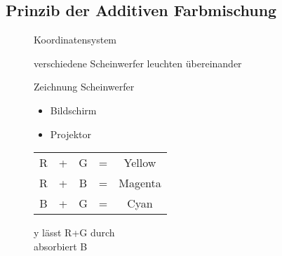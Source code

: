 \documentclass[11pt]{article}
\begin{document}
\subsection{Prinzib der Additiven Farbmischung}
\begin{figure}[!hb]
\begin{minipage}[c]{6cm}
{\color{red}Koordinatensystem}
\end{minipage}
\hfill
\begin{minipage}[c]{9cm}
verschiedene Scheinwerfer leuchten übereinander\\
\begin{minipage}[c]{4cm}
{\color{red}Zeichnung Scheinwerfer}
\end{minipage}
\hfill
\begin{minipage}[c]{4.5cm}
\vfill
\begin{itemize}
\item Bildschirm
\item Projektor
\end{itemize}
\vfill
\end{minipage}
\end{minipage}
\vfill
\begin{minipage}[c]{14cm}
\begin{minipage}[r]{7cm}
\begin{tabular}{ccccc}
R & + & G & = & Yellow \\
R & + & B & = & Magenta \\
B & + & G & = & Cyan \\
\end{tabular}
\end{minipage}
\hfill
\begin{minipage}[c]{6.8cm}
y lässt R+G durch\\
absorbiert B
\end{minipage}
\end{minipage}
\end{figure}
\end{document}
